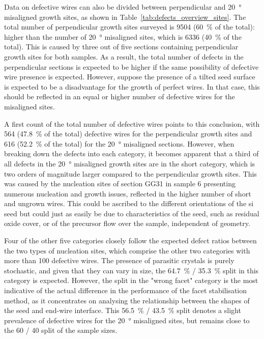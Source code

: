 Data on defective wires can also be divided between perpendicular and \qty{20}{\degree} misaligned growth sites, as shown in Table~\ref{tab:defects_overview_sites}. The total number of perpendicular growth sites surveyed is \num{9504} (\qty{60}{\%} of the total): higher than the number of \qty{20}{\degree} misaligned sites, which is \num{6336} (\qty{40}{\%} of the total). This is caused by three out of five sections containing perpendicular growth sites for both samples. As a result, the total number of defects in the perpendicular sections is expected to be higher if the same possibility of defective wire presence is expected. However, suppose the presence of a tilted seed surface is expected to be a disadvantage for the growth of perfect wires. In that case, this should be reflected in an equal or higher number of defective wires for the misaligned sites.

A first count of the total number of defective wires points to this conclusion, with \num{564} (\qty{47.8}{\%} of the total) defective wires for the perpendicular growth sites and \num{616} (\qty{52.2}{\%} of the total) for the \qty{20}{\degree} misaligned sections. However, when breaking down the defects into each category, it becomes apparent that a third of all defects in the \qty{20}{\degree} misaligned growth sites are in the short category, which is two orders of magnitude larger compared to the perpendicular growth sites. This was caused by the nucleation sites of section GG31 in sample 6 presenting numerous nucleation and growth issues, reflected in the higher number of short and ungrown wires. This could be ascribed to the different orientations of the \acl{si} seed but could just as easily be due to characteristics of the seed, such as residual oxide cover, or of the precursor flow over the sample, independent of geometry.

Four of the other five categories closely follow the expected defect ratios between the two types of nucleation sites, which comprise the other two categories with more than \num{100} defective wires. The presence of parasitic crystals is purely stochastic, and given that they can vary in size, the \qty{64.7}{\%} / \qty{35.3}{\%} split in this category is expected. However, the split in the "wrong facet" category is the most indicative of the actual difference in the performance of the facet stabilisation method, as it concentrates on analysing the relationship between the shapes of the seed and end-wire interface. This \qty{56.5}{\%} / \qty{43.5}{\%} split denotes a slight prevalence of defective wires for the \qty{20}{\degree} misaligned sites, but remains close to the \num{60} / \num{40} split of the sample sizes.

